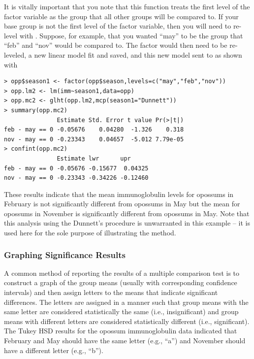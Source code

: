 \documentclass[10pt,openany]{book}\usepackage[]{graphicx}\usepackage[]{color}
\makeatletter
\newenvironment{kframe}{%
 \def\at@end@of@kframe{}%
 \ifinner\ifhmode%
  \def\at@end@of@kframe{\end{minipage}}%
  \begin{minipage}{\columnwidth}%
 \fi\fi%
 \def\FrameCommand##1{\hskip\@totalleftmargin \hskip-\fboxsep
 \colorbox{shadecolor}{##1}\hskip-\fboxsep
     \hskip-\linewidth \hskip-\@totalleftmargin \hskip\columnwidth}%
 \MakeFramed {\advance\hsize-\width
   \@totalleftmargin\z@ \linewidth\hsize
   \@setminipage}}%
 {\par\unskip\endMakeFramed%
 \at@end@of@kframe}
\newenvironment{knitrout}{}{} %
\makeatother
\begin{document}
It is vitally important that you note that this function treats the first level of the factor variable as the group that all other groups will be compared to.  If your base group is not the first level of the factor variable, then you will need to re-level with .  Suppose, for example, that you wanted ``may'' to be the group that ``feb'' and ``nov'' would be compared to.  The factor would then need to be re-leveled, a new linear model fit and saved, and this new model sent to  as shown with

\begin{knitrout}
\color{fgcolor}\begin{kframe}
\begin{verbatim}
> opp$season1 <- factor(opp$season,levels=c("may","feb","nov"))
> opp.lm2 <- lm(imm~season1,data=opp)
> opp.mc2 <- glht(opp.lm2,mcp(season1="Dunnett"))
> summary(opp.mc2)
               Estimate Std. Error t value Pr(>|t|)
feb - may == 0 -0.05676    0.04280  -1.326    0.318
nov - may == 0 -0.23343    0.04657  -5.012 7.79e-05
> confint(opp.mc2)
               Estimate lwr      upr     
feb - may == 0 -0.05676 -0.15677  0.04325
nov - may == 0 -0.23343 -0.34226 -0.12460
\end{verbatim}
\end{kframe}
\end{knitrout}

These results indicate that the mean immunoglobulin levels for opossums in February is not significantly different from opossums in May but the mean for opossums in November is significantly different from opossums in May.  Note that this analysis using the Dunnett's procedure is unwarranted in this example -- it is used here for the sole purpose of illustrating the method.

\subsubsection*{Graphing Significance Results}
A common method of reporting the results of a multiple comparison test is to construct a graph of the group means (usually with corresponding confidence intervals) and then assign letters to the means that indicate significant differences.  The letters are assigned in a manner such that group means with the same letter are considered statistically the same (i.e., insignificant) and group means with different letters are considered statistically different (i.e., significant).  The Tukey HSD results for the opossum immunoglobulin data indicated that February and May should have the same letter (e.g., ``a'') and November should have a different letter (e.g., ``b'').
\end{document}
